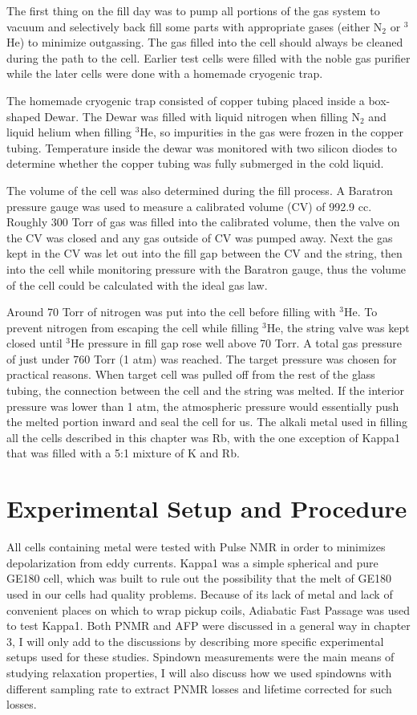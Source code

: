The first thing on the fill day was to pump all portions of the gas system to vacuum and selectively back fill some parts with appropriate gases (either N$_2$ or $^{3}$He) to minimize outgassing. The gas filled into the cell should always be cleaned during the path to the cell. Earlier test cells were filled with the noble gas purifier while the later cells were done with a homemade cryogenic trap.

The homemade cryogenic trap consisted of copper tubing placed inside a box-shaped Dewar. The Dewar was filled with liquid nitrogen when filling N$_2$ and liquid helium when filling $^{3}$He, so impurities in the gas were frozen in the copper tubing. Temperature inside the dewar was monitored with two silicon diodes to determine whether the copper tubing was fully submerged in the cold liquid.

The volume of the cell was also determined during the fill process. A Baratron pressure gauge was used to measure a calibrated volume (CV) of 992.9 cc. Roughly 300 Torr of gas was filled into the calibrated volume, then the valve on the CV was closed and any gas outside of CV was pumped away. Next the gas kept in the CV was let out into the fill gap between the CV and the string, then into the cell while monitoring pressure with the Baratron gauge, thus the volume of the cell could be calculated with the ideal gas law.

Around 70 Torr of nitrogen was put into the cell before filling with $^{3}$He. To prevent nitrogen from escaping the cell while filling $^{3}$He, the string valve was kept closed until $^{3}$He pressure in fill gap rose well above 70 Torr. A total gas pressure of just under 760 Torr (1 atm) was reached. The target pressure was chosen for practical reasons. When target cell was pulled off from the rest of the glass tubing, the connection between the cell and the string was melted. If the interior pressure was lower than 1 atm, the atmospheric pressure would essentially push the melted portion inward and seal the cell for us. The alkali metal used in filling all the cells described in this chapter was Rb, with the one exception of Kappa1 that was filled with a 5:1 mixture of K and Rb.

\section{Experimental Setup and Procedure}

All cells containing metal were tested with Pulse NMR in order to minimizes depolarization from eddy currents. Kappa1 was a simple spherical and pure GE180 cell, which was built to rule out the possibility that the melt of GE180 used in our cells had quality problems. Because of its lack of metal and lack of convenient places on which to wrap pickup coils, Adiabatic Fast Passage was used to test Kappa1. Both PNMR and AFP were discussed in a general way in chapter 3, I will only add to the discussions by describing more specific experimental setups used for these studies. Spindown measurements were the main means of studying relaxation properties, I will also discuss how we used spindowns with different sampling rate to extract PNMR losses and lifetime corrected for such losses.

